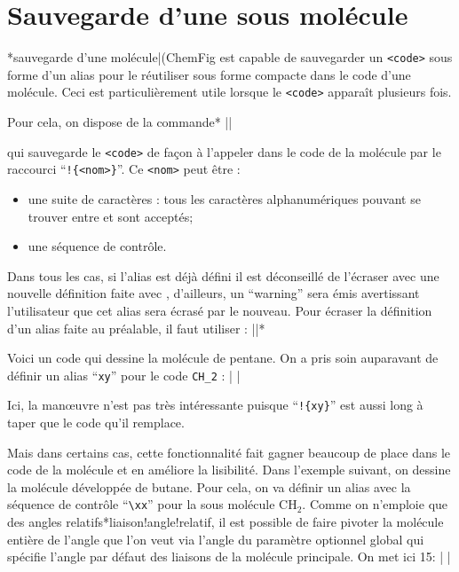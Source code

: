 \documentclass[10pt]{article}
\makeatletter
\newcommand\idx{\@ifstar{\let\print@or@not\@gobble\idx@}{\let\print@or@not\@firstofone\idx@}}
\newcommand\idx@[1]{%
	\ifcat\expandafter\noexpand\@car#1\@nil\relax%
		\expandafter\ifx\@car#1\@nil\protect
			\index{#1}%
			\print@or@not{#1}%
		\else
			\saveexpandmode\expandarg
			\StrSubstitute{\string#1}{\string @}{\@empty\protect\symbol{'100}}[\temp@]%
			\StrGobbleLeft\temp@1[\temp@]%
			\restoreexpandmode
			\expandafter\index\expandafter{\temp@ @\protect\texttt{\protect\textbackslash\temp@}}%
			\print@or@not{\texttt{\string#1}}%
		\fi
	\else
		\index{#1}%
		\print@or@not{#1}%
	\fi
}
\newcommand\make@car@active[2]{%
	\catcode`#1\active
	\begingroup
		\lccode`\~`#1\relax
		\lowercase{\endgroup\def~{#2}}%
}
\newif\if@exstar
\newcommand\exemple{%
	\begingroup
	\parskip\z@
	\@makeother\;\@makeother\!\@makeother\?\@makeother\:%
	\@ifstar{\@exstartrue\exemple@}{\@exstarfalse\exemple@}}
\newcommand\exemple@[2][65]{%
	\medbreak\noindent
	\begingroup
		\let\do\@makeother\dospecials
		\make@car@active\ { {}}%
		\make@car@active\^^M{\par\leavevmode}%
		\make@car@active\,{\leavevmode\kern\z@\string,}%
		\make@car@active\-{\leavevmode\kern\z@\string-}%
		\make@car@active\>{\leavevmode\kern\z@\string>}%
		\make@car@active\<{\leavevmode\kern\z@\string<}%
		\exemple@@{#1}{#2}%
}
\newcommand\exemple@@[3]{%
	\def\@tempa##1#3{\exemple@@@{#1}{#2}{##1}}%
	\@tempa
}
\newcommand\exemple@@@[3]{%
	\xdef\the@code{#3}%
	\endgroup
	\if@exstar
		\begingroup
			\fboxrule0.4pt
			\let\breakboxparindent\z@
			\def\bkvz@bottom{\hrule\@height\fboxrule}%
			\let\bkvz@before@breakbox\relax
			\def\bkvz@set@linewidth{\advance\linewidth\dimexpr-2\fboxrule-2\fboxsep}%
			\def\bkvz@left{\vrule\@width\fboxrule\hskip\fboxsep}%
			\def\bkvz@right{\hskip\fboxsep\vrule\@width\fboxrule}%
			\def\bkvz@top{\hbox to \hsize{%
				\vrule\@width\fboxrule\@height\fboxrule
				\leaders\bkvz@bottom\hfill
				\ECFAugie
				\fboxsep\z@
				\colorbox{black}{\kern0.25em\color{white}\footnotesize\lower0.5ex\hbox{\strut#2}\kern0.25em}%
				\leaders\bkvz@bottom\hfill
				\vrule\@width\fboxrule\@height\fboxrule}}%
			\breakbox
				\kern.5ex\relax
				\ttfamily\footnotesize\the@code\par
				\normalfont
				\kern3pt
				\hrule height0.1pt width\linewidth depth0.1pt
				\vskip5pt
				\rightskip0pt plus 1fill
				\everypar{{\color{lightgray}\rlap{\vrule height0.1pt width\linewidth depth0.1pt}}\hskip0pt plus 1fill}%
				\newlinechar`\^^M\everyeof{\noexpand}\scantokens{#3}\par
			\endbreakbox
		\endgroup
	\else
		\vskip0.5ex
		\boxput*(0,1)
			{\fboxsep\z@
			\hbox{\ECFAugie\colorbox{black}{\leavevmode\kern0.25em{\color{white}\footnotesize\strut#2}\kern0.25em}}%
			}%
			{\fboxsep5pt
			\fbox{%
				$\vcenter{\hsize\dimexpr0.#1\linewidth-\fboxsep-\fboxrule\relax
					\kern5pt\parskip0pt \ttfamily\footnotesize\the@code}%
				\vcenter{\kern5pt\hsize\dimexpr\linewidth-0.#1\linewidth-\fboxsep-\fboxrule\relax
					\everypar{{\color{lightgray}\rlap{\vrule height0.1pt width\dimexpr\linewidth-0.#1\linewidth-\fboxsep-\fboxrule depth0.1pt}}}%
					\footnotesize\newlinechar`\^^M\everyeof{\noexpand}\scantokens{#3}}$%
				}%
			}%
	\fi
	\medbreak
	\endgroup
}
\let\do\@makeother\dospecials
\newcommand\CF{{\ECFAugie ChemFig}\xspace}
\makeatother
\begin{document}
\section{Sauvegarde d'une sous molécule}\label{definesubmol}
\idx*{sauvegarde d'une molécule|(}\CF est capable de sauvegarder un \verb-<code>- sous forme d'un alias pour le réutiliser sous forme compacte dans le code d'une molécule. Ceci est particulièrement utile lorsque le \verb-<code>- apparaît plusieurs fois.

Pour cela, on dispose de la commande\idx*{}
\centerverb||
\smallskip

qui sauvegarde le \verb/<code>/ de façon à l'appeler dans le code de la molécule par le raccourci ``\verb/!{<nom>}/''. Ce \verb-<nom>- peut être :
\begin{itemize}
	\item une suite de caractères : tous les caractères alphanumériques pouvant se trouver entre \texttt{\string\csname} et \texttt{\string\endcsname} sont acceptés;
	\item une séquence de contrôle.
\end{itemize}

Dans tous les cas, si l'alias est déjà défini il est déconseillé de l'écraser avec une nouvelle définition faite avec \idx{\definesubmol}, d'ailleurs, un ``warning'' sera émis avertissant l'utilisateur que cet alias sera écrasé par le nouveau. Pour écraser la définition d'un alias faite au préalable, il faut utiliser :\label{redefinesubmol}
\centerverb||\idx*\redefinesubmol
\smallskip

Voici un code qui dessine la molécule de pentane. On a pris soin auparavant de définir un alias ``\verb/xy/'' pour le code \verb/CH_2/ :
\exemple{Pentane}|
|

Ici, la manœuvre n'est pas très intéressante puisque ``\verb/!{xy}/'' est aussi long à taper que le code qu'il remplace.

Mais dans certains cas, cette fonctionnalité fait gagner beaucoup de place dans le code de la molécule et en améliore la lisibilité. Dans l'exemple suivant, on dessine la molécule développée de butane. Pour cela, on va définir un alias avec la séquence de contrôle ``\verb/\xx/'' pour la sous molécule $\mathrm{CH_2}$. Comme on n'emploie que des angles relatifs\idx*{liaison!angle!relatif}, il est possible de faire pivoter la molécule entière de l'angle que l'on veut via l'angle du paramètre optionnel global qui spécifie l'angle par défaut des liaisons de la molécule principale. On met ici 15\degres :
\exemple{Butane}|
|
\end{document}
